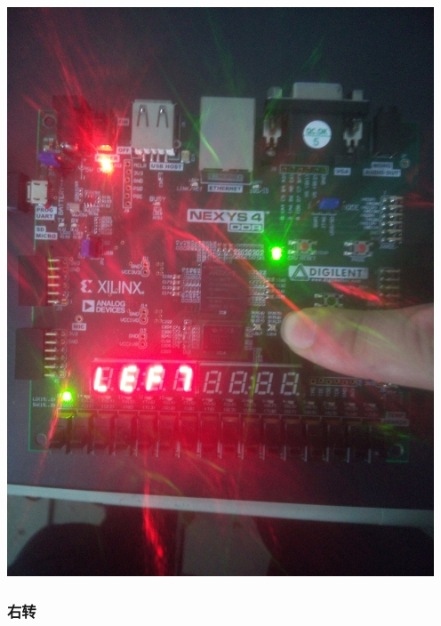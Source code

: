 \documentclass[11pt, a4paper]{article}
\begin{document}
\begin{CJK*}{UTF8}{gbsn}
\begin{appendices}
  \begin{center}
    \includegraphics[width = 5in]{left2.jpg}
  \end{center}

  \subsubsection*{右转}


\end{appendices}
\end{CJK*}
\end{document}
